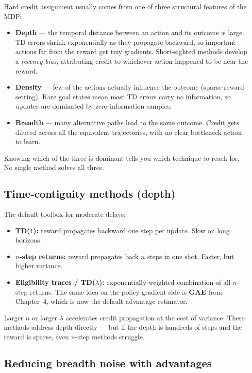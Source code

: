 \documentclass[11pt, oneside]{book}
\begin{document}
Hard credit assignment usually comes from one of three structural features of the MDP:
\begin{itemize}
  \item \textbf{Depth} --- the temporal distance between an action and its outcome is large.
    TD errors shrink exponentially as they propagate backward, so important actions far
    from the reward get tiny gradients. Short-sighted methods develop a \emph{recency
    bias}, attributing credit to whichever action happened to be near the reward.
  \item \textbf{Density} --- few of the actions actually influence the outcome
    (sparse-reward setting). Rare goal states mean most TD errors carry no information,
    so updates are dominated by zero-information samples.
  \item \textbf{Breadth} --- many alternative paths lead to the same outcome.
    Credit gets diluted across all the equivalent trajectories, with no clear bottleneck
    action to learn.
\end{itemize}
Knowing which of the three is dominant tells you which technique to reach for. No single
method solves all three.

\subsection{Time-contiguity methods (depth)}

The default toolbox for moderate delays:
\begin{itemize}
  \item \textbf{TD($1$):} reward propagates backward one step per update. Slow on long horizons.
  \item \textbf{$n$-step returns:} reward propagates back $n$ steps in one shot. Faster, but
    higher variance.
  \item \textbf{Eligibility traces / TD($\lambda$):} exponentially-weighted combination of
    all $n$-step returns. The same idea on the policy-gradient side is \textbf{GAE}
    from Chapter~4, which is now the default advantage estimator.
\end{itemize}
Larger $n$ or larger $\lambda$ accelerates credit propagation at the cost of variance.
These methods address depth directly --- but if the depth is hundreds of steps and the
reward is sparse, even $n$-step methods struggle.

\subsection{Reducing breadth noise with advantages}
\end{document}
